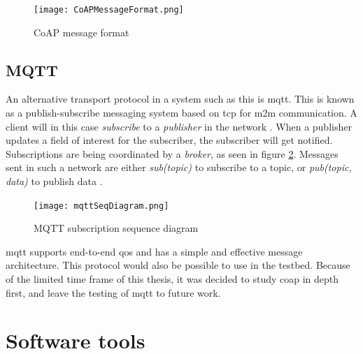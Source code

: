 
\begin{figure}[ht]
    \centering
    \texttt{[image: CoAPMessageFormat.png]}    
    \caption{CoAP message format \cite{shelby2014constrained}}
    \label{fig:CoAPMessageFormat}
\end{figure}






\subsection{MQTT}

\noindent An alternative transport protocol in a system such as this is \gls{mqtt}. This is  known as a publish-subscribe messaging system based on \gls{tcp} for \gls{m2m} communication. A client will in this case \textit{subscribe} to a \textit{publisher} in the network \cite{hunkeler2008mqtt}. When a publisher updates a field of interest for the subscriber, the subscriber will get notified. Subscriptions are being coordinated by a \textit{broker}, as seen in figure \ref{fig:mqttSeqDiagram}. Messages sent in such a network are either \textit{sub(topic)} to subscribe to a topic, or \textit{pub(topic, data)} to publish data \cite{mqttWebsite}. 


\begin{figure}[ht]
    \centering
    \texttt{[image: mqttSeqDiagram.png]}    
    \caption{MQTT subscription sequence diagram \cite{hunkeler2008mqtt}}
    \label{fig:mqttSeqDiagram}
\end{figure}

\noindent \gls{mqtt} supports end-to-end \gls{qos} and has a simple and effective message architecture. This protocol would also be possible to use in the testbed. Because of the limited time frame of this thesis, it was decided to study \gls{coap} in depth first, and leave the testing of \gls{mqtt} to future work. 


\section{Software tools}


